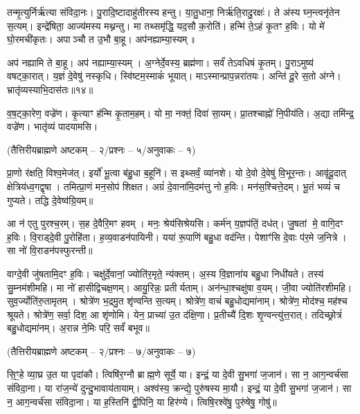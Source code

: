 तन्मृ॒त्युर्निर्\mbox{}ऋ॑त्या संविदा॒नः।
पु॒रादि॒ष्टादाहु॑तीरस्य हन्तु।
या॒तु॒धाना॒ निर्\mbox{}ऋ॑ति॒रादु॒रक्षः॑।
ते अ॑स्य घ्न॒न्त्वनृ॑तेन स॒त्यम्।
इन्द्रे॑षिता॒ आज्य॑मस्य मथ्नन्तु।
मा तथ्समृ॑द्धि॒ यद॒सौ क॒रोति॑।
हन्मि॑ ते॒ऽहं कृ॒तꣳ ह॒विः।
यो मे॑ घो॒रमची॑कृतः।
अपाञ्चौ त उ॒भौ बा॒हू।
अप॑नह्याम्या॒स्यम्॥

अप॑ नह्यामि ते बा॒हू।
अप॑ नह्याम्या॒स्यम्।
अ॒ग्नेर्दे॒वस्य॒ ब्रह्म॑णा।
सर्वं॑ तेऽवधिषं कृ॒तम्।
पु॒राऽमुष्य॑ वषट्का॒रात्।
य॒ज्ञं दे॒वेषु॑ नस्कृधि।
स्वि॑ष्टम॒स्माकं॑ भूयात्।
माऽस्मान्प्राप॒न्न\-रा॑तयः।
अन्ति॑ दू॒रे स॒तो अ॑ग्ने।
भ्रातृ॑व्यस्याभि॒दास॑तः॥१४॥

व॒ष॒ट्का॒रेण॒ वज्रे॑ण।
कृ॒त्याꣳ ह॑न्मि कृ॒ताम॒हम्।
यो मा॒ नक्तं॒ दिवा॑ सा॒यम्।
प्रा॒तश्चाह्नो॑ नि॒पीय॑ति।
अ॒द्या तमि॑न्द्र॒ वज्रे॑ण।
भातृ॑व्यं पादयामसि।

\centerline{\scriptsize (तैत्तिरीयब्राह्मणे अष्टकम् – २/प्रश्नः – ५/अनुवाकः – १)}

प्रा॒णो र॑क्षति॒ विश्व॒मेज॑त्।
इर्यो॑ भू॒त्वा ब॑हु॒धा ब॒हूनि॑।
स इथ्सर्वं॒ व्या॑नशे।
यो दे॒वो दे॒वेषु॑ वि॒भूर॒न्तः।
आवृ॑दू॒दात् क्षेत्रिय॑ध्व॒गद्वृषा।
तमित्प्रा॒णं मन॒सोप॑ शिक्षत।
अग्रं॑ दे॒वाना॑मि॒दम॑त्तु नो ह॒विः।
मन॑स॒श्चित्ते॒दम्।
भू॒तं भव्यं॑ च गुप्यते।
तद्धि दे॒वेष्व॑ग्रि॒यम्॥

आ न॑ एतु पुरश्च॒रम्।
स॒ह दे॒वैरि॒मꣳ हवम्।
मनः॒ श्रेय॑सिश्रेयसि।
कर्म॑न् य॒ज्ञप॑तिं॒ दध॑त्।
जु॒षतां मे॒ वागि॒दꣳ ह॒विः।
वि॒राड्दे॒वी पु॒रोहि॑ता।
ह॒व्य॒वाडन॑पायिनी।
यया॑ रू॒पाणि॑ बहु॒धा वद॑न्ति।
पेशाꣳ॑सि दे॒वाः प॑र॒मे ज॒नित्रे।
सा नो॑ वि॒राडन॑पस्फुरन्ती॥

वाग्दे॒वी जु॑षतामि॒दꣳ ह॒विः।
चक्षु॑र्दे॒वानां॒ ज्योति॑र॒मृते॒ न्य॑क्तम्।
अ॒स्य वि॒ज्ञाना॑य बहु॒धा निधी॑यते।
तस्य॑ सु॒म्नम॑शीमहि।
मा नो॑ हासीद्विचक्ष॒णम्।
आयु॒रिन्नः॒ प्रतीर्यताम्।
अन॑न्धा॒श्चक्षु॑षा व॒यम्।
जी॒वा ज्योति॑रशीमहि।
सुव॒र्ज्योति॑रु॒तामृतम्।
श्रोत्रे॑ण भ॒द्रमु॒त शृ॑ण्वन्ति स॒त्यम्।
श्रोत्रे॑ण॒ वाचं॑ बहु॒धोद्यमा॑नाम्।
श्रोत्रे॑ण॒ मोद॑श्च॒ मह॑श्च श्रूयते।
श्रोत्रे॑ण॒ सर्वा॒ दिश॒ आ शृ॑णोमि।
येन॒ प्राच्या॑ उ॒त द॑क्षि॒णा।
प्र॒तीच्यै॑ दि॒शः शृ॒ण्वन्त्यु॑त्त॒रात्।
तदिच्छ्रोत्रं॑ बहु॒धोद्यमा॑नम्।
अ॒रान्न ने॒मिः परि॒ सर्वं॑ बभूव॥

\centerline{\scriptsize (तैत्तिरीयब्राह्मणे अष्टकम् – २/प्रश्नः – ७/अनुवाकः – ७)}
सि॒ꣳ॒हे व्या॒घ्र उ॒त या पृदा॑कौ।
त्विषि॑र॒ग्नौ ब्राह्म॒णे सूर्ये॒ या।
इन्द्रं॒ या दे॒वी सु॒भगा॑ ज॒जान॑।
सा न॒ आग॒न्वर्च॑सा संविदा॒ना।
या रा॑ज॒न्ये॑ दुन्दु॒भावाय॑तायाम्।
अश्व॑स्य॒ क्रन्द्ये॒ पुरु॑षस्य मा॒यौ।
इन्द्रं॒ या दे॒वी सु॒भगा॑ ज॒जान॑।
सा न॒ आग॒न्वर्च॑सा संविदा॒ना।
या ह॒स्तिनि॑ द्वी॒पिनि॒ या हिर॑ण्ये।
त्विषि॒रश्वे॑षु॒ पुरु॑षेषु॒ गोषु॑॥

